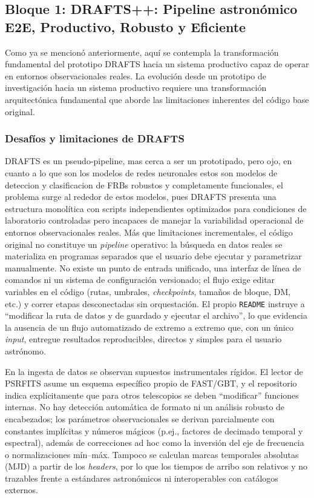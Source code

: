 \subsection{Bloque 1: DRAFTS++: Pipeline astronómico E2E, Productivo, Robusto y Eficiente}

Como ya se mencionó anteriormente, aquí se contempla la transformación fundamental del prototipo DRAFTS hacia un sistema productivo capaz de operar en entornos observacionales reales. La evolución desde un prototipo de investigación hacia un sistema productivo requiere una transformación arquitectónica fundamental que aborde las limitaciones inherentes del código base original.

\subsubsection{Desafíos y limitaciones de DRAFTS}

DRAFTS es un pseudo-pipeline, mas cerca a ser un prototipado, pero ojo, en cuanto a lo que son los modelos de redes neuronales estos son modelos de deteccion y clasificacion de FRBs robustos y completamente funcionales, el problema surge al rededor de estos modelos, pues DRAFTS presenta una estructura monolítica con scripts independientes optimizados para condiciones de laboratorio controladas pero incapaces de manejar la variabilidad operacional de entornos observacionales reales. Más que limitaciones incrementales, el código original no constituye un \emph{pipeline} operativo: la búsqueda en datos reales se materializa en programas separados que el usuario debe ejecutar y parametrizar manualmente. No existe un punto de entrada unificado, una interfaz de línea de comandos ni un sistema de configuración versionado; el flujo exige editar variables en el código (rutas, umbrales, \textit{checkpoints}, tamaños de bloque, DM, etc.) y correr etapas desconectadas sin orquestación. El propio \texttt{README} instruye a “modificar la ruta de datos y de guardado y ejecutar el archivo”, lo que evidencia la ausencia de un flujo automatizado de extremo a extremo que, con un único \emph{input}, entregue resultados reproducibles, directos y simples para el usuario astrónomo.

En la ingesta de datos se observan supuestos instrumentales rígidos. El lector de PSRFITS asume un esquema específico propio de FAST/GBT, y el repositorio indica explícitamente que para otros telescopios se deben “modificar” funciones internas. No hay detección automática de formato ni un análisis robusto de encabezados; los parámetros observacionales se derivan parcialmente con constantes implícitas y números mágicos (p.ej., factores de decimado temporal y espectral), además de correcciones ad hoc como la inversión del eje de frecuencia o normalizaciones mín--máx. Tampoco se calculan marcas temporales absolutas (MJD) a partir de los \emph{headers}, por lo que los tiempos de arribo son relativos y no trazables frente a estándares astronómicos ni interoperables con catálogos externos.

